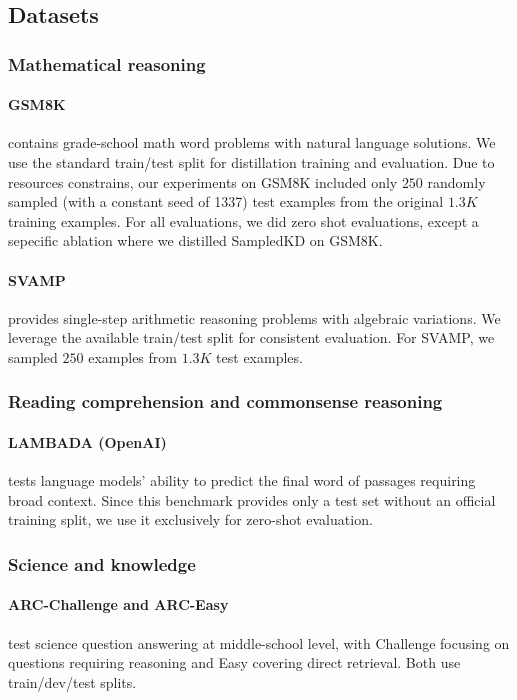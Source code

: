 \documentclass[11pt]{article}
\begin{document}
\subsection{Datasets}

\subsubsection{Mathematical reasoning}
\paragraph{GSM8K} \citep{cobbe2021gsm8k} contains grade-school math word problems with natural language solutions. We use the standard train/test split for distillation training and evaluation.
Due to resources constrains, our experiments on GSM8K included only $250$ randomly sampled (with a constant seed of 1337) test examples from the original $1.3K$ training examples.
For all evaluations, we did zero shot evaluations, except a sepecific ablation where we distilled SampledKD on GSM8K.
\paragraph{SVAMP} \citep{patel2021svamp} provides single-step arithmetic reasoning problems with algebraic variations. We leverage the available train/test split for consistent evaluation.
For SVAMP, we sampled $250$ examples from $1.3K$ test examples.

\subsubsection{Reading comprehension and commonsense reasoning}
\paragraph{LAMBADA (OpenAI)} \citep{paperno2016lambada} tests language models' ability to predict the final word of passages requiring broad context. Since this benchmark provides only a test set without an official training split, we use it exclusively for zero-shot evaluation.

\subsubsection{Science and knowledge}
\paragraph{ARC-Challenge and ARC-Easy} \citep{clark2018arc} test science question answering at middle-school level, with Challenge focusing on questions requiring reasoning and Easy covering direct retrieval. Both use train/dev/test splits.
\end{document}
